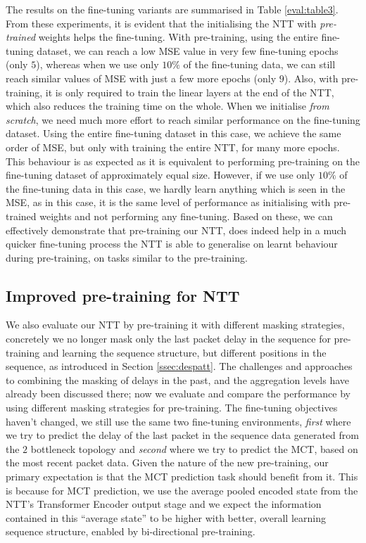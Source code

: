 The results on the fine-tuning variants are summarised in Table \ref{eval:table3}. From these experiments, it is evident that the initialising the NTT with \emph{pre-trained} weights helps the fine-tuning. With pre-training, using the entire fine-tuning dataset, we can reach a low MSE value in very few fine-tuning epochs (only $5$), whereas when we use only $10\%$ of the fine-tuning data, we can still reach similar values of MSE with just a few more epochs (only $9$). Also, with pre-training, it is only required to train the linear layers at the end of the NTT, which also reduces the training time on the whole. When we initialise \emph{from scratch}, we need much more effort to reach similar performance on the fine-tuning dataset. Using the entire fine-tuning dataset in this case, we achieve the same order of MSE, but only with training the entire NTT, for many more epochs. This behaviour is as expected as it is equivalent to performing pre-training on the fine-tuning dataset of approximately equal size. However, if we use only $10\%$ of the fine-tuning data in this case, we hardly learn anything which is seen in the MSE, as in this case, it is the same level of performance as initialising with pre-trained weights and not performing any fine-tuning. Based on these, we can effectively demonstrate that pre-training our NTT, does indeed help in a much quicker fine-tuning process \ie the NTT is able to generalise on learnt behaviour during pre-training, on tasks similar to the pre-training.


\subsection{Improved pre-training for NTT}
\label{ssec:impptt}

We also evaluate our NTT by pre-training it with different masking strategies, concretely we no longer mask only the last packet delay in the sequence for pre-training and learning the sequence structure, but different positions in the sequence, as introduced in Section \ref{ssec:despatt}. The challenges and approaches to combining the masking of delays in the past, and the aggregation levels have already been discussed there; now we evaluate and compare the performance by using different masking strategies for pre-training. The fine-tuning objectives haven't changed, we still use the same two fine-tuning environments, \emph{first} where we try to predict the delay of the last packet in the sequence data generated from the $2$ bottleneck topology and \emph{second} where we try to predict the MCT, based on the most recent packet data. Given the nature of the new pre-training, our primary expectation  is that the MCT prediction task should benefit from it. This is because for MCT prediction, we use the average pooled encoded state from the NTT's Transformer Encoder output stage and we expect the information contained in this ``average state'' to be higher with better, overall learning sequence structure, enabled by bi-directional pre-training. 

